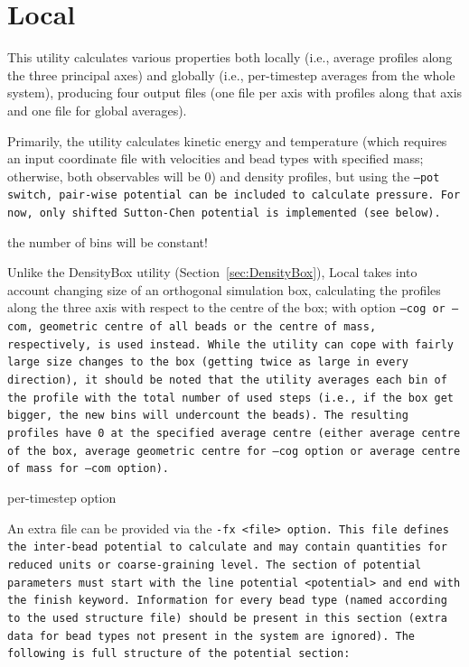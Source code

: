 \section{Local} \label{sec:Local}

This utility calculates various properties both locally (i.e., average profiles
along the three principal axes) and globally (i.e., per-timestep averages from
the whole system), producing four output files (one file per axis with profiles
along that axis and one file for global averages).

Primarily, the utility calculates kinetic energy and temperature (which requires
an input coordinate file with velocities and bead types with specified mass;
otherwise, both observables will be 0) and density profiles, but using the
\tt{--pot} switch, pair-wise potential can be included to calculate pressure.
For now, only shifted Sutton-Chen potential is implemented (see below).

\TODO the number of bins will be constant!

Unlike the DensityBox utility (Section~\ref{sec:DensityBox}), Local takes into
account changing size of an orthogonal simulation box, calculating the profiles
along the three axis with respect to the centre of the box; with option
\tt{--cog} or \tt{--com}, geometric centre of all beads or the centre of mass,
respectively, is used instead. While the utility can cope with fairly large size
changes to the box (getting twice as large in every direction), it should be
noted that the utility averages each bin of the profile with the total number of
used steps (i.e., if the box get bigger, the new bins will undercount the beads).
The resulting profiles have 0 at the specified average centre (either average
centre of the box, average geometric centre for \tt{--cog} option or average
centre of mass for \tt{--com} option).

\TODO per-timestep option

An extra file can be provided via the \tt{-fx <file>} option. This file defines
the inter-bead potential to calculate and may contain quantities for reduced
units or coarse-graining level. The section of potential parameters must start
with the line \tt{potential <potential>} and end with the \tt{finish} keyword.
Information for every bead type (named according to the used structure file)
should be present in this section (extra data for bead types not present in the
system are ignored). The following is full structure of the \tt{potential}
section:


